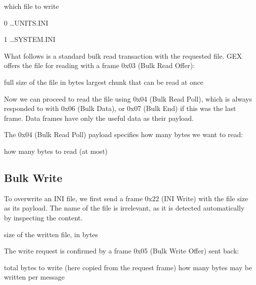 \begin{boxedpayload}
	 which file to write
		\begin{pldlist}
			\item 0 \dots UNITS.INI
			\item 1 \dots SYSTEM.INI
		\end{pldlist}
\end{boxedpayload}

What follows is a standard bulk read transaction with the requested file.
GEX offers the file for reading with a frame 0x03 (Bulk Read Offer):

\begin{boxedpayload}
	 full size of the file in bytes
	 largest chunk that can be read at once
\end{boxedpayload}

Now we can proceed to read the file using 0x04 (Bulk Read Poll), which is always responded to with 0x06 (Bulk Data), or 0x07 (Bulk End) if this was the last frame. Data frames have only the useful data as their payload.

The 0x04 (Bulk Read Poll) payload specifies how many bytes we want to read:

\begin{boxedpayload}
	 how many bytes to read (at most)
\end{boxedpayload}

\subsection{Bulk Write}

To overwrite an INI file, we first send a frame 0x22 (INI Write) with the file size as its payload. The name of the file is irrelevant, as it is detected automatically by inspecting the content.

\begin{boxedpayload}
	 size of the written file, in bytes
\end{boxedpayload}

The write request is confirmed by a frame 0x05 (Bulk Write Offer) sent back:

\begin{boxedpayload}
	 total bytes to write (here copied from the request frame)
	 how many bytes may be written per message
\end{boxedpayload}

